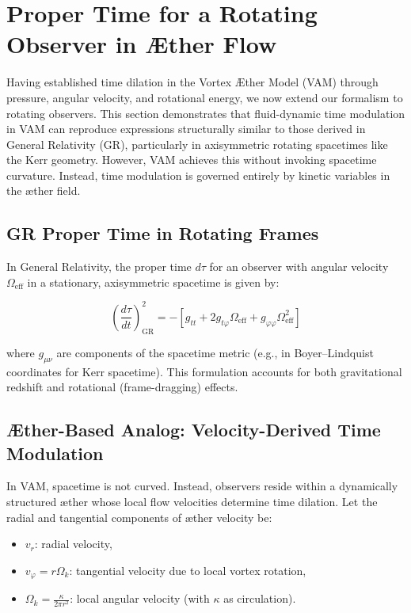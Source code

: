 \section{Proper Time for a Rotating Observer in Æther Flow}

Having established time dilation in the Vortex Æther Model (VAM) through pressure, angular velocity, and rotational energy, we now extend our formalism to rotating observers. This section demonstrates that fluid-dynamic time modulation in VAM can reproduce expressions structurally similar to those derived in General Relativity (GR), particularly in axisymmetric rotating spacetimes like the Kerr geometry. However, VAM achieves this without invoking spacetime curvature. Instead, time modulation is governed entirely by kinetic variables in the æther field.

\subsection{GR Proper Time in Rotating Frames}

In General Relativity, the proper time \(d\tau\) for an observer with angular velocity \(\Omega_{\text{eff}}\) in a stationary, axisymmetric spacetime is given by:

\begin{equation}
\left( \frac{d\tau}{dt} \right)^2_{\text{GR}} = -\left[ g_{tt} + 2g_{t\varphi} \Omega_{\text{eff}} + g_{\varphi\varphi} \Omega_{\text{eff}}^2 \right]
 \label{eq:GR_proper_time}
\end{equation}

where \(g_{\mu\nu}\) are components of the spacetime metric (e.g., in Boyer–Lindquist coordinates for Kerr spacetime). This formulation accounts for both gravitational redshift and rotational (frame-dragging) effects.

\subsection{Æther-Based Analog: Velocity-Derived Time Modulation}

In VAM, spacetime is not curved. Instead, observers reside within a dynamically structured æther whose local flow velocities determine time dilation. Let the radial and tangential components of æther velocity be:

\begin{itemize}
\item \(v_r\): radial velocity,
\item \(v_\varphi = r\Omega_k\): tangential velocity due to local vortex rotation,
\item \(\Omega_k = \frac{\kappa}{2\pi r^2}\): local angular velocity (with \(\kappa\) as circulation).
\end{itemize}

